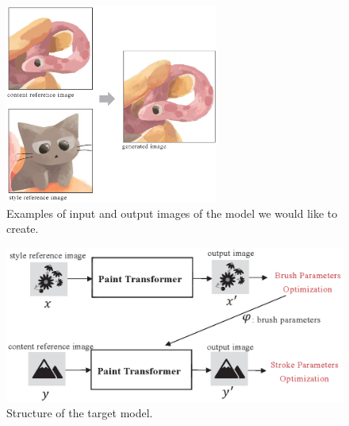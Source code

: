 \documentclass{mva_style}
\begin{document}
\begin{figure}
  \centering
  \includegraphics[width=70mm]{resource/haru.eps}
  \caption{Examples of input and output images of the model we would like to create.}
  \label{fig:haru}
\end{figure}

\begin{figure}[t]
  \centering
  \includegraphics[width=120mm]{resource/target_model.eps}
  \caption{Structure of the target model.}
  \label{fig:final_model}
\end{figure}
\end{document}
